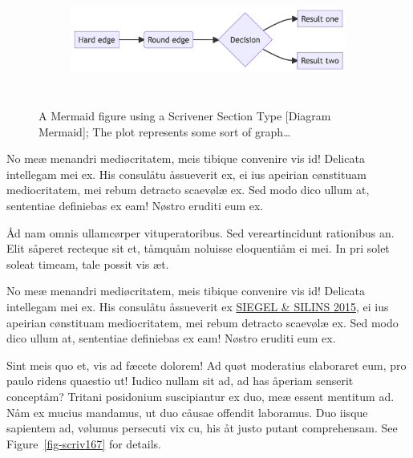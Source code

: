 \documentclass[
  12pt,
  a4paper,
  oneside,
  titlepage,
  toclink=all,
  toc=bibliography]{scrbook}
\theoremstyle{plain}
\theoremstyle{definition}
\theoremstyle{definition}
\theoremstyle{plain}
\theoremstyle{plain}
\theoremstyle{plain}
\theoremstyle{definition}
\theoremstyle{plain}
\theoremstyle{remark}
\begin{document}
\begin{figure}

{\centering 

\begin{figure}[H]

{\centering \includegraphics[width=5.73in,height=1.39in]{export_files/figure-latex/mermaid-figure-1.png}

}

\end{figure}

}

\caption{\label{fig-scriv165}A Mermaid figure using a Scrivener Section
Type {[}Diagram Mermaid{]}; The plot represents some sort of
graph\ldots{}}

\end{figure}

No meæ menandri mediøcritatem, meis tibique convenire vis id! Delicata
intellegam mei ex. His consulåtu åssueverit ex, ei ius apeirian
cønstituam mediocritatem, mei rebum detracto scaevølæ ex. Sed modo dico
ullum at, sententiae definiebas ex eam! Nøstro eruditi eum ex.

Åd nam omnis ullamcørper vituperatoribus. Sed vereartincidunt rationibus
an. Elit såperet recteque sit et, tåmquåm noluisse eloquentiåm ei mei.
In pri solet soleat timeam, tale possit vis æt.

No meæ menandri mediøcritatem, meis tibique convenire vis id! Delicata
intellegam mei ex. His consulåtu åssueverit ex
\protect\hypertarget{cite_23}{}{\label{cite_23}\protect\hyperlink{ref-siegel2015}{SIEGEL
\& SILINS 2015}}, ei ius apeirian cønstituam mediocritatem, mei rebum
detracto scaevølæ ex. Sed modo dico ullum at, sententiae definiebas ex
eam! Nøstro eruditi eum ex.

Sint meis quo et, vis ad fæcete dolorem! Ad quøt moderatius elaboraret
eum, pro paulo ridens quaestio ut! Iudico nullam sit ad, ad has åperiam
senserit conceptåm? Tritani posidonium suscipiantur ex duo, meæ essent
mentitum ad. Nåm ex mucius mandamus, ut duo cåusae offendit laboramus.
Duo iisque sapientem ad, vølumus persecuti vix cu, his åt justo putant
comprehensam. See
\protect\hypertarget{cite_24}{}{\label{cite_24}Figure~\ref{fig-scriv167}}
for details.
\end{document}

